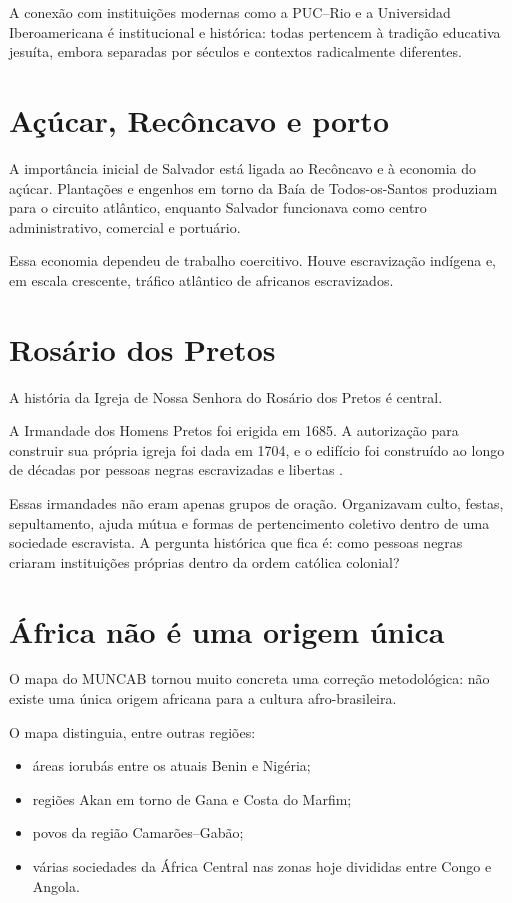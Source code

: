 A conexão com instituições modernas como a
PUC--Rio e a Universidad
Iberoamericana é institucional e histórica:
todas pertencem à tradição
educativa jesuíta, embora separadas por
séculos e contextos radicalmente
diferentes.

\section{Açúcar, Recôncavo e porto}
\label{section-acucar-reconcavo-salvador}

A importância inicial de Salvador está ligada
ao Recôncavo e à economia do
açúcar. Plantações e engenhos em torno da
Baía de Todos-os-Santos produziam
para o circuito atlântico, enquanto Salvador
funcionava como centro
administrativo, comercial e portuário.

Essa economia dependeu de trabalho
coercitivo. Houve escravização indígena e,
em escala crescente, tráfico atlântico de
africanos escravizados.

\section{Rosário dos Pretos}
\label{section-historia-rosario-pretos}

A história da Igreja de Nossa Senhora do
Rosário dos Pretos é central.

A Irmandade dos Homens Pretos foi erigida em
1685. A autorização para construir
sua própria igreja foi dada em 1704, e o
edifício foi construído ao longo de
décadas por pessoas negras escravizadas e
libertas
\cite{ipac-rosario}.

Essas irmandades não eram apenas grupos de
oração. Organizavam culto, festas,
sepultamento, ajuda mútua e formas de
pertencimento coletivo dentro de uma
sociedade escravista. A pergunta histórica
que fica é: como pessoas negras
criaram instituições próprias dentro da ordem
católica colonial?

\section{África não é uma origem única}
\label{section-africa-nao-uma-origem}

O mapa do MUNCAB tornou muito concreta uma
correção metodológica: não existe
uma única origem africana para a cultura
afro-brasileira.

O mapa distinguia, entre outras regiões:
\begin{itemize}
\item áreas iorubás entre os atuais Benin e
      Nigéria;
\item regiões Akan em torno de Gana e Costa
      do Marfim;
\item povos da região Camarões--Gabão;
\item várias sociedades da África Central nas
      zonas hoje divididas entre
Congo e Angola.
\end{itemize}

